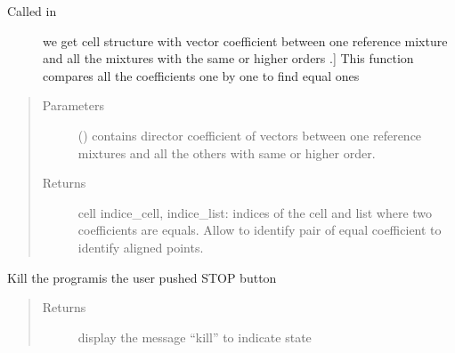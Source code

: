 \documentclass[letterpaper,10pt,english]{sphinxmanual}
\begin{document}
\label{\detokenize{ExperimentsPlannification:module-modules}}

\begin{fulllineitems}
\label{\detokenize{ExperimentsPlannification:modules.index_alignments}}\begin{description}
\item[{Called in }] \leavevmode{[}we get cell structure with vector coefficient between one reference mixture and all the mixtures with the same or higher orders .{]}
\sphinxAtStartPar
This function compares all the coefficients one by one to find equal ones

\end{description}
\begin{quote}\begin{description}
\item[{Parameters}] \leavevmode
\sphinxAtStartPar
{} () \textendash{} contains director coefficient of vectors between one reference mixtures and all the others with same or higher order.

\item[{Returns}] \leavevmode
\sphinxAtStartPar
cell indice\_cell, indice\_list: indices of the cell and list where two coefficients are equals. Allow to identify pair of equal coefficient to identify aligned points.

\end{description}\end{quote}

\end{fulllineitems}

\label{\detokenize{ExperimentsPlannification:module-modules}}

\begin{fulllineitems}
\label{\detokenize{ExperimentsPlannification:modules.kill_program}}
\sphinxAtStartPar
Kill the programis the user pushed STOP button
\begin{quote}\begin{description}
\item[{Returns}] \leavevmode
\sphinxAtStartPar
display the message “kill” to indicate state

\end{description}\end{quote}

\end{fulllineitems}
\end{document}
